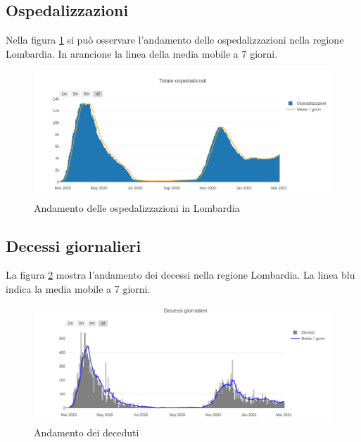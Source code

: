 \subsection{Ospedalizzazioni}
Nella figura \ref{fig:ospedalizzati_lomb} si può osservare l'andamento delle ospedalizzazioni nella regione Lombardia.
In arancione la linea della media mobile a 7 giorni.
\begin{figure}[htp]
    \centering
    \includegraphics[width=14cm]{img/lomb/ospedalizzati_lomb.png}
    \caption{Andamento delle ospedalizzazioni in Lombardia}
    \label{fig:ospedalizzati_lomb}
\end{figure}

\subsection{Decessi giornalieri}
La figura \ref{fig:decessi_lomb} mostra l'andamento dei decessi nella regione Lombardia.
La linea blu indica la media mobile a 7 giorni.
\begin{figure}[htp]
    \centering
    \includegraphics[width=14cm]{img/lomb/decessi_lomb.png}
    \caption{Andamento dei deceduti}
    \label{fig:decessi_lomb}
\end{figure}

